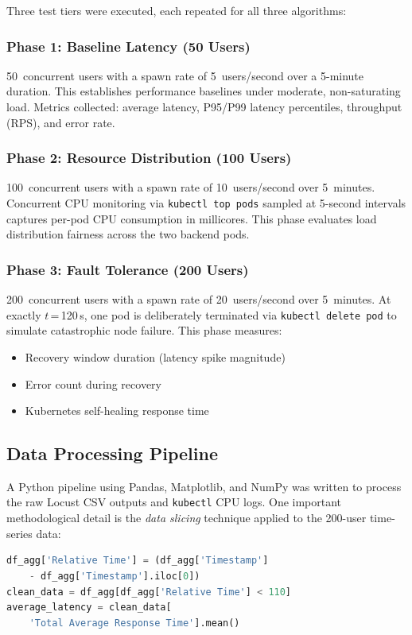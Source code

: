 \documentclass[conference]{IEEEtran}
\begin{document}
Three test tiers were executed, each repeated for all three algorithms:

\subsubsection{Phase 1: Baseline Latency (50 Users)}
50~concurrent users with a spawn rate of 5~users/second over a 5-minute duration. This establishes performance baselines under moderate, non-saturating load. Metrics collected: average latency, P95/P99 latency percentiles, throughput (RPS), and error rate.

\subsubsection{Phase 2: Resource Distribution (100 Users)}
100~concurrent users with a spawn rate of 10~users/second over 5~minutes. Concurrent CPU monitoring via \texttt{kubectl top pods} sampled at 5-second intervals captures per-pod CPU consumption in millicores. This phase evaluates load distribution fairness across the two backend pods.

\subsubsection{Phase 3: Fault Tolerance (200 Users)}
200~concurrent users with a spawn rate of 20~users/second over 5~minutes. At exactly $t$\,=\,120\,s, one pod is deliberately terminated via \texttt{kubectl delete pod} to simulate catastrophic node failure. This phase measures:
\begin{itemize}
    \item Recovery window duration (latency spike magnitude)
    \item Error count during recovery
    \item Kubernetes self-healing response time
\end{itemize}

\subsection{Data Processing Pipeline}

A Python pipeline using Pandas, Matplotlib, and NumPy was written to process the raw Locust CSV outputs and \texttt{kubectl} CPU logs. One important methodological detail is the \textit{data slicing} technique applied to the 200-user time-series data:

\begin{lstlisting}[language=Python, caption={Data slicing for clean scalability comparison}, label={lst:slice}]
df_agg['Relative Time'] = (df_agg['Timestamp']
    - df_agg['Timestamp'].iloc[0])
clean_data = df_agg[df_agg['Relative Time'] < 110]
average_latency = clean_data[
    'Total Average Response Time'].mean()
\end{lstlisting}
\end{document}
